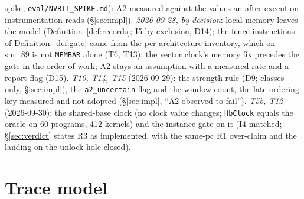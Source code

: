 \documentclass[11pt]{article}
\theoremstyle{remark}
\begin{document}
spike, \texttt{eval/NVBIT\_SPIKE.md}): A2 measured against the values an after-execution
instrumentation reads (\S\ref{sec:impl}). \emph{2026-09-28, by decision}: local memory
leaves the model (Definition~\ref{def:records}; I5 by exclusion, D14); the fence
instructions of Definition~\ref{def:gate} come from the per-architecture inventory,
which on sm\_89 is not \texttt{MEMBAR} alone (T6, T13); the vector clock's memory fix
precedes the gate in the order of work; A2 stays an assumption with a measured rate and
a report flag (D15). \emph{T10, T14, T15} (2026-09-29): the strength rule (D9; classes only,
\S\ref{sec:impl}), the \texttt{a2\_uncertain} flag and the window count, the late ordering
key measured and not adopted (\S\ref{sec:impl}, ``A2 observed to fail''). \emph{T5b, T12}
(2026-09-30): the shared-base clock (no clock value changes; \texttt{HbClock} equals the oracle on 60
programs, 412 kernels) and the instance gate on it (I4 matched; \S\ref{sec:verdict} states R3
as implemented, with the same-pc R1 over-claim and the landing-on-the-unlock hole closed).

\section{Trace model}\label{sec:model}
\end{document}

